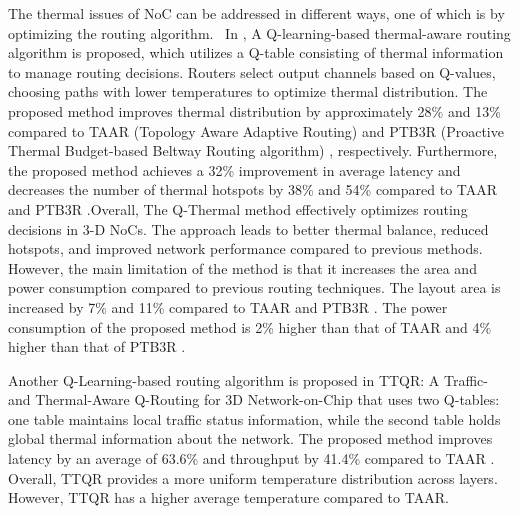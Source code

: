 \documentclass[conference]{IEEEtran}
\begin{document}
The thermal issues of NoC can be addressed in different ways, one of which is by optimizing the routing algorithm.  In \cite{example1}, A Q-learning-based thermal-aware routing algorithm is proposed, which utilizes a Q-table consisting of thermal information to manage routing decisions. Routers select output channels based on Q-values, choosing paths with lower temperatures to optimize thermal distribution.
The proposed method improves thermal distribution by approximately 28\% and 13\% compared to TAAR (Topology Aware Adaptive Routing) \cite{TAAR_ref} and PTB3R (Proactive Thermal Budget-based Beltway Routing algorithm) \cite{PTB3R_ref}, respectively. Furthermore, the proposed method achieves a 32\% improvement in average latency and decreases the number of thermal hotspots by 38\% and 54\% compared to TAAR \cite{TAAR_ref} and PTB3R \cite{PTB3R_ref}.Overall, The Q-Thermal method effectively optimizes routing decisions in 3-D NoCs. The approach leads to better thermal balance, reduced hotspots, and improved network performance compared to previous methods. However, the main limitation of the method is that it increases the area and power consumption compared to previous routing techniques. The layout area is increased by 7\% and 11\% compared to TAAR \cite{TAAR_ref} and  PTB3R \cite{PTB3R_ref}. The power consumption of the proposed method is 2\% higher than that of TAAR \cite{TAAR_ref} and 4\% higher than that of PTB3R \cite{PTB3R_ref}.

Another Q-Learning-based routing algorithm is proposed in TTQR: A Traffic- and Thermal-Aware Q-Routing for 3D Network-on-Chip \cite{TTQR_ref} that uses two Q-tables: one table maintains local traffic status information, while the second table holds global thermal information about the network. The proposed method improves latency by an average of 63.6\% and throughput by 41.4\% compared to TAAR \cite{TAAR_ref}. Overall, TTQR provides a more uniform temperature distribution across layers. However, TTQR has a higher average temperature compared to TAAR.
\end{document}
